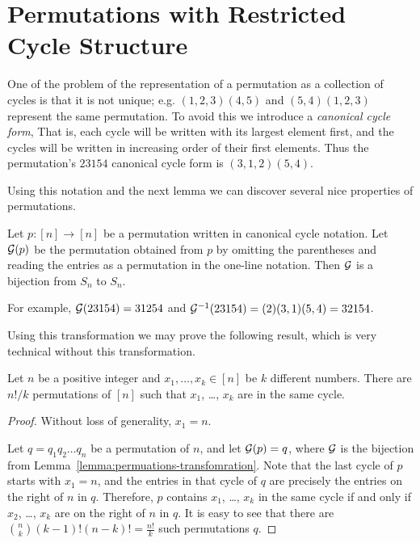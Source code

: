 \section{Permutations with Restricted Cycle Structure}
One of the problem of the representation of a permutation as a collection of
cycles is that it is not unique; e.g. $(1, 2, 3) (4, 5)$ and $(5, 4) (1, 2, 3)$
represent the same permutation. To avoid this we introduce a \emph{canonical
cycle form}, That is, each cycle will be written with its largest element first,
and the cycles will be written in increasing order of their first elements. Thus
the permutation's $2 3 1 5 4$ canonical cycle form is $(3, 1, 2) (5, 4)$.

Using this notation and the next lemma we can discover several nice properties
of permutations.
\begin{lemma}
\label{lemma:permuations-transfomration}
  Let $p : [n] \to [n]$ be a permutation written in canonical cycle notation.
  Let $\mathcal{G}(p)$ be the permutation obtained from $p$ by omitting the
  parentheses and reading the entries as a permutation in the one-line notation.
  Then $\mathcal{G}$ is a bijection from $S_n$ to $S_n$.
\end{lemma}
For example, $\mathcal{G}(2 3 1 5 4) = 31254$ and
$\mathcal{G}^{-1}(2 3 1 5 4) = (2) (3, 1) (5, 4) = 32154$.

Using this transformation we may prove the following result, which is very
technical without this transformation.
\begin{theorem}
  Let $n$ be a positive integer and $x_1, \dots, x_k \in [n]$ be $k$ different
  numbers. There are $n! / k$ permutations of $[n]$ such that $x_1$, \dots,
  $x_k$ are in the same cycle.
\end{theorem}
\begin{proof}
  Without loss of generality, $x_1 = n$.

  Let $q = q_1 q_2 \dots q_n$ be a permutation of $n$, and let $\mathcal{G}(p) = q$,
  where $\mathcal{G}$ is the bijection from
  Lemma~\ref{lemma:permuations-transfomration}.
  Note that the last cycle of $p$ starts with $x_1 = n$, and the entries in that
  cycle of $q$ are precisely the entries on the right of $n$ in $q$. Therefore,
  $p$ contains $x_1$, \dots, $x_k$ in the same cycle if and only if $x_2$,
  \dots, $x_k$ are on the right of $n$ in $q$. It is easy to see that
  there are $\binom{n}{k} (k - 1)! (n - k)! = \frac{n!}{k}$ such permutations
  $q$.
\end{proof}

